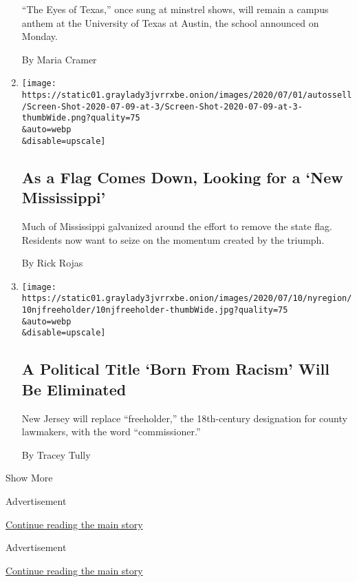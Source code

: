 \begin{enumerate}
  ``The Eyes of Texas,'' once sung at minstrel shows, will remain a
  campus anthem at the University of Texas at Austin, the school
  announced on Monday.

  By Maria Cramer
\item
  \href{/2020/07/10/us/mississippi-confederate-flag.html}{}

  \texttt{[image: https://static01.graylady3jvrrxbe.onion/images/2020/07/01/autossell/Screen-Shot-2020-07-09-at-3/Screen-Shot-2020-07-09-at-3-thumbWide.png?quality=75\\\&auto=webp\\\&disable=upscale]}

  \hypertarget{as-a-flag-comes-down-looking-for-a-new-mississippi}{%
  \subsection{As a Flag Comes Down, Looking for a `New
  Mississippi'}\label{as-a-flag-comes-down-looking-for-a-new-mississippi}}

  Much of Mississippi galvanized around the effort to remove the state
  flag. Residents now want to seize on the momentum created by the
  triumph.

  By Rick Rojas
\item
  \href{/2020/07/10/nyregion/Freeholder-new-jersey.html}{}

  \texttt{[image: https://static01.graylady3jvrrxbe.onion/images/2020/07/10/nyregion/10njfreeholder/10njfreeholder-thumbWide.jpg?quality=75\\\&auto=webp\\\&disable=upscale]}

  \hypertarget{a-political-title-born-from-racism-will-be-eliminated}{%
  \subsection{A Political Title `Born From Racism' Will Be
  Eliminated}\label{a-political-title-born-from-racism-will-be-eliminated}}

  New Jersey will replace ``freeholder,'' the 18th-century designation
  for county lawmakers, with the word ``commissioner.''

  By Tracey Tully
\end{enumerate}

Show More

Advertisement

\protect\hyperlink{after-mid2}{Continue reading the main story}

Advertisement

\protect\hyperlink{after-mktg}{Continue reading the main story}

